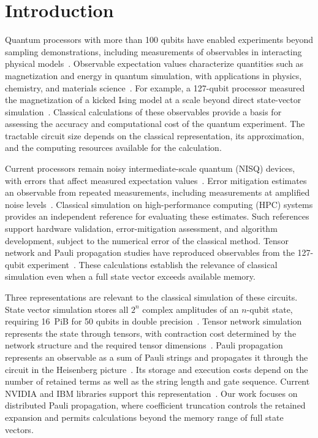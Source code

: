 \section{Introduction}
\label{sec:intro}

Quantum processors with more than 100 qubits have enabled experiments beyond sampling demonstrations, including measurements of observables in interacting physical models~\cite{arute2019quantum,kim2023evidence}.
Observable expectation values characterize quantities such as magnetization and energy in quantum simulation, with applications in physics, chemistry, and materials science~\cite{georgescu2014simulation}.
For example, a 127-qubit processor measured the magnetization of a kicked Ising model at a scale beyond direct state-vector simulation~\cite{kim2023evidence}.
Classical calculations of these observables provide a basis for assessing the accuracy and computational cost of the quantum experiment.
The tractable circuit size depends on the classical representation, its approximation, and the computing resources available for the calculation.

Current processors remain noisy intermediate-scale quantum (NISQ) devices, with errors that affect measured expectation values~\cite{preskill2018quantum}.
Error mitigation estimates an observable from repeated measurements, including measurements at amplified noise levels~\cite{kim2023evidence}.
Classical simulation on high-performance computing (HPC) systems provides an independent reference for evaluating these estimates.
Such references support hardware validation, error-mitigation assessment, and algorithm development, subject to the numerical error of the classical method.
Tensor network and Pauli propagation studies have reproduced observables from the 127-qubit experiment~\cite{tindall2024efficient,begusic2024fast}.
These calculations establish the relevance of classical simulation even when a full state vector exceeds available memory.

Three representations are relevant to the classical simulation of these circuits.
State vector simulation stores all $2^n$ complex amplitudes of an $n$-qubit state, requiring 16~PiB for 50 qubits in double precision~\cite{haner2017petabyte}.
Tensor network simulation represents the state through tensors, with contraction cost determined by the network structure and the required tensor dimensions~\cite{tindall2024efficient}.
Pauli propagation represents an observable as a sum of Pauli strings and propagates it through the circuit in the Heisenberg picture~\cite{begusic2024fast,rudolph2025pauli}.
Its storage and execution costs depend on the number of retained terms as well as the string length and gate sequence.
Current NVIDIA and IBM libraries support this representation~\cite{cupauliprop,qiskitpauliprop}.
Our work focuses on distributed Pauli propagation, where coefficient truncation controls the retained expansion and permits calculations beyond the memory range of full state vectors.

